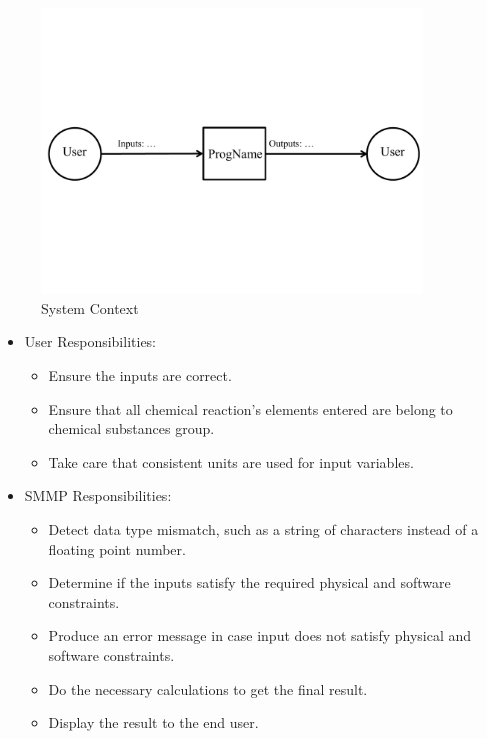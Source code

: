 \documentclass[12pt]{article}
\begin{document}
\begin{figure}[h!]
\begin{center}
 \includegraphics[width=0.9\textwidth]{SystemContextFigure}
\caption{System Context}
\label{Fig_SystemContext} 
\end{center}
\end{figure}


\begin{itemize}
\item User Responsibilities:
\begin{itemize}
\item Ensure the inputs are correct.
\item Ensure that all chemical reaction's elements entered are belong to chemical substances group.
\item Take care that consistent units are used for input variables.
\end{itemize}
\item SMMP Responsibilities:
\begin{itemize}
\item Detect data type mismatch, such as a string of characters instead of a
  floating point number.
\item Determine if the inputs satisfy the required physical and software constraints.
\item Produce an error message in case input does not satisfy physical and software constraints.
\item Do the necessary calculations to get the final result.
\item Display the result to the end user.
\end{itemize}
\end{itemize}
\end{document}
